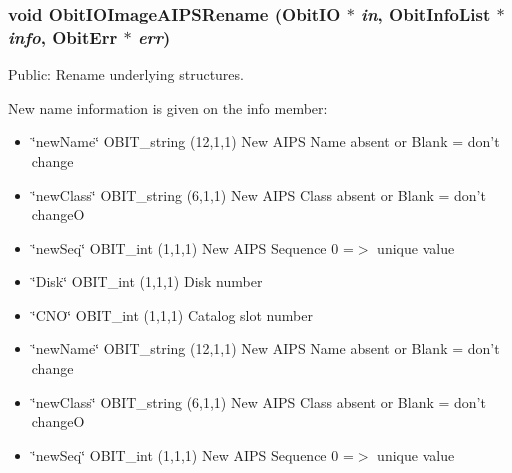 \subsubsection{\setlength{\rightskip}{0pt plus 5cm}void Obit\-IOImage\-AIPSRename ({\bf Obit\-IO} $\ast$ {\em in}, {\bf Obit\-Info\-List} $\ast$ {\em info}, {\bf Obit\-Err} $\ast$ {\em err})}\label{ObitIOImageAIPS_8c_a9}


Public: Rename underlying structures. 

New name information is given on the info member: \begin{itemize}
\item \char`\"{}new\-Name\char`\"{} OBIT\_\-string (12,1,1) New AIPS Name absent or Blank = don't change \item \char`\"{}new\-Class\char`\"{} OBIT\_\-string (6,1,1) New AIPS Class absent or Blank = don't change\-O \item \char`\"{}new\-Seq\char`\"{} OBIT\_\-int (1,1,1) New AIPS Sequence 0 =$>$ unique value 
\item \char`\"{}Disk\char`\"{} OBIT\_\-int (1,1,1) Disk number \item \char`\"{}CNO\char`\"{} OBIT\_\-int (1,1,1) Catalog slot number \item \char`\"{}new\-Name\char`\"{} OBIT\_\-string (12,1,1) New AIPS Name absent or Blank = don't change \item \char`\"{}new\-Class\char`\"{} OBIT\_\-string (6,1,1) New AIPS Class absent or Blank = don't change\-O \item \char`\"{}new\-Seq\char`\"{} OBIT\_\-int (1,1,1) New AIPS Sequence 0 =$>$ unique value 
\end{itemize}
